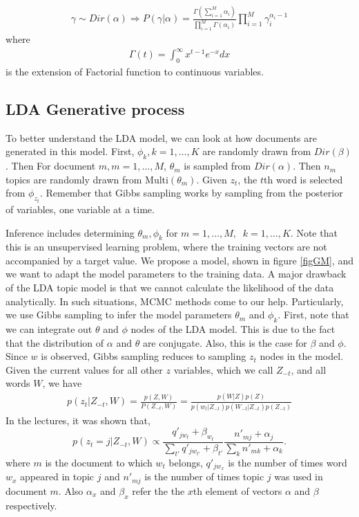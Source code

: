 \documentclass[twoside,12pt]{article}
\begin{document}
\begin{align}
\gamma \sim Dir(\alpha) \Rightarrow P(\gamma | \alpha) = \frac{\Gamma(\sum_{i=1}^M \alpha_i)}{\prod_{i=1}^M \Gamma(\alpha_i)} \prod_{i=1}^M \gamma_i^{\alpha_i -1} 
\end{align}
where
\begin{align}
\Gamma(t) = \int_0^\infty x^{t-1} e^{-x} dx
\end{align}
is the extension of Factorial function to continuous variables.
\subsection{ LDA Generative process}
To better understand the LDA model, we can look at how documents are generated in this model. First, $\phi_k, k=1,\ldots,K$ are randomly drawn from $Dir(\beta)$. Then For document $m, m=1,\ldots,M$, $\theta_m$ is sampled from $Dir(\alpha)$. Then $n_m$ topics are randomly drawn from Multi$(\theta_m)$. Given $z_t$, the $t$th word is selected from $\phi_{z_t}$. Remember that Gibbs sampling works by sampling from the posterior of variables, one variable at a time. 


Inference includes determining $\theta_m, \phi_k$ for $m=1,\ldots,M,\;\; k=1,\ldots,K$. Note that this is an unsupervised learning problem, where the training vectors are not accompanied by a target value. We propose a model, shown in figure \ref{figGM}, and we want to adapt the model parameters to the training data. A major drawback of the LDA topic model is that we cannot calculate the likelihood of the data analytically. In such situations, MCMC methods come to our help. Particularly, we use Gibbs sampling to infer the model parameters $\theta_m$ and $\phi_k$. First, note that we can integrate out $\theta$ and $\phi$ nodes of the LDA model. This is due to the fact that the distribution of $\alpha$ and $\theta$ are conjugate. Also, this is the case for $\beta$ and $\phi$. Since $w$ is observed, Gibbs sampling reduces to sampling $z_t$ nodes in the model. Given the current values for all other $z$ variables, which we call $Z_{-t}$, and all words $W$, we have
\begin{align}
p(z_t|Z_{-t},W)=\frac{p(Z,W)}{P(Z_{-t},W)}=\frac{p(W|Z)p(Z)}{p(w_t|Z_{-t})p(W_{-t}|Z_{-t})p(Z_{-t})}
\end{align}
In the lectures, it was shown that,
\begin{equation}
p(z_t=j|Z_{-t},W)\propto \frac{q'_{jw_t}+\beta_{w_t}}{\sum_{t'} q'_{jw_{t'}}+\beta_{t'}}\frac{n'_{mj}+\alpha_j}{\sum_k n'_{mk}+\alpha_k}.
\end{equation}
where $m$ is the document to which $w_t$ belongs, $q'_{jw_{x}}$ is the number of times word $w_x$ appeared in topic $j$ and $n'_{mj}$ is the number of times topic $j$ was used in document $m$. Also $\alpha_x$ and $\beta_x$ refer the the $x$th element of vectors $\alpha$ and $\beta$ respectively.
\end{document}
